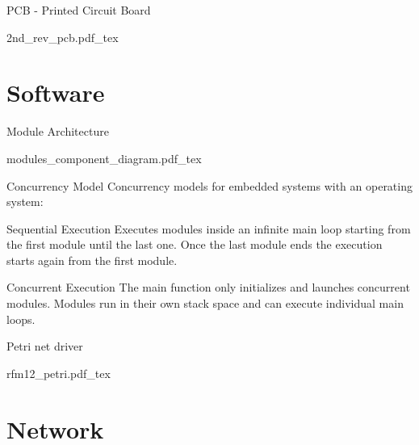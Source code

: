 \begin{frame}{PCB - Printed Circuit Board}
\begin{center}
\scalebox{0.59} {
    {2nd_rev_pcb.pdf_tex}
}
\end{center}
\end{frame}

\section{Software}
\begin{frame}{Module Architecture}
\begin{center}
\scalebox{0.8} {
    {modules_component_diagram.pdf_tex}
}
\end{center} 
\end{frame}

\begin{frame}{Concurrency Model}
Concurrency models for embedded systems with an operating system:

\begin{block}{Sequential Execution}
Executes modules inside an infinite main loop starting from the first module until the last one.
Once the last module ends the execution starts again from the first module.
\end{block}
\begin{block}{Concurrent Execution}
The main function only initializes and launches concurrent modules. Modules run in their own stack space and can execute individual main loops.
\end{block}
\end{frame}

\begin{frame}{Petri net driver}
\begin{center}
\scalebox{0.8} {
    {rfm12_petri.pdf_tex}
}
\end{center}
\end{frame}

\section{Network}

